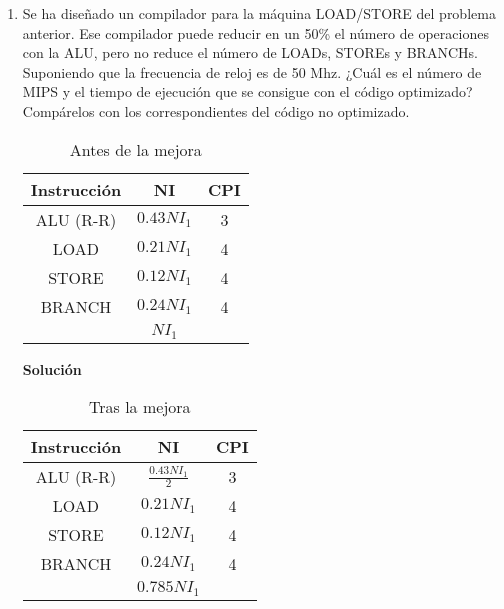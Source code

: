 \documentclass[12pt,spanish]{article}
\newenvironment{solution}{
	\par
	\textbf{Solución}
	\par
	\begin{center}
}
{
	\end{center}
}
\begin{document}
\begin{enumerate}
\begin{solution}
\[CPI_2=\frac{0.3225NI_1}{0.8925NI_1}\cdot 3 + \frac{0.1075NI_1}{0.8925NI_1} \cdot 4 + \frac{0.21NI_1}{0.8925NI_1} \cdot 4 + \frac{0.12NI_1}{0.8925NI_1} \cdot 4 + \frac{0.24NI_1}{0.8925NI_1} \cdot 4 = 3.91\]
\[T_{CPU2}=3.91 \cdot 0.8925NI_1 \cdot T_{ciclo2}= 3.49NI_1 \cdot T_{ciclo1} \]
Como $T_{CPU2}<T_{CPU1}$; la mejora \textbf{es efectiva}.
\end{solution}
\newpage
\item Se  ha  diseñado un compilador para la máquina LOAD/STORE del problema anterior. Ese compilador puede reducir en un 50\% el número de operaciones con la ALU, pero no reduce el número de LOADs, STOREs y BRANCHs. Suponiendo que la  frecuencia de reloj es de 50 Mhz. ¿Cuál es el número de MIPS y el tiempo de   ejecución que se consigue con el código optimizado? Compárelos con los correspondientes del código no optimizado.
\begin{table}[H]
\centering
\begin{tabular}{|c|c|c|}
\hline
\textbf{Instrucción} & \textbf{NI} & \textbf{CPI} \\
\hline
ALU (R-R) & $0.43NI_1$ & 3 \\
\hline
LOAD & $0.21NI_1$ & 4 \\
\hline
STORE & $0.12NI_1$ & 4 \\
\hline
BRANCH & $0.24NI_1$ & 4 \\
\hline
& $NI_1$ & \\
\hline
\end{tabular}
\caption*{Antes de la mejora}
\end{table}
\begin{solution}

\begin{table}[H]
\centering
\begin{tabular}{|c|c|c|}
\hline
\textbf{Instrucción} & \textbf{NI} & \textbf{CPI} \\
\hline
ALU (R-R) & $\frac{0.43NI_1}{2}$ & 3 \\
\hline
LOAD & $0.21NI_1$ & 4 \\
\hline
STORE & $0.12NI_1$ & 4 \\
\hline
BRANCH & $0.24NI_1$ & 4 \\
\hline
& $0.785NI_1$ & \\
\hline
\end{tabular}
\caption*{Tras la mejora}
\end{table}


\end{solution}
\end{enumerate}
\end{document}
